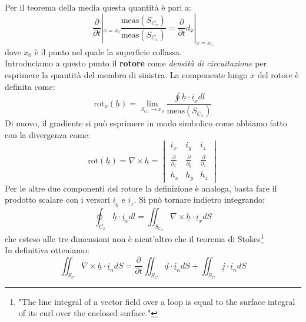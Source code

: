 \documentclass{book}
\begin{document}
        Per il teorema della media questa quantità è pari a:
        \begin{equation}
            \frac{\partial}{\partial t}|_{x=x_{0}} \frac{\textrm{meas}(S_{C_{x}})}{\textrm{meas}(S_{C_{x}})} = \frac{\partial}{\partial t} d_{x}|_{x=x_{0}}
        \end{equation}
        dove $x_{0}$ è il punto nel quale la superficie collassa. \\
        Introduciamo a questo punto il \textbf{rotore} come \textit{densità di circuitazione} per esprimere la quantità del membro di sinistra. La componente lungo $x$ del rotore è definita come:
        \begin{equation}
            \textrm{rot}_{x}(\underline{h}) = \lim_{S_{C_{x}} \to x_{0}} \frac{\displaystyle \oint \underline{h} \cdot \underline{i}_{x} dl}{\textrm{meas}(S_{C_{x}})}
        \end{equation}
        Di nuovo, il gradiente si può esprimere in modo simbolico come abbiamo fatto con la divergenza come:
        \begin{equation}
            \textrm{rot}(\underline{h}) = \nabla \times \underline{h} = \begin{vmatrix} i_{x} & i_{y} & i_{z} \\ \frac{\partial}{\partial_{x}} & \frac{\partial}{\partial_{y}} & \frac{\partial}{\partial_{z}}  \\ h_{x} & h_{y} & h_{z} \end{vmatrix}
        \end{equation}
        Per le altre due componenti del rotore la definizione è analoga, basta fare il prodotto scalare con i versori $\underline{i}_{y}$ e $\underline{i}_{z}$. Si può tornare indietro integrando:
        \begin{equation}
            \oint_{C_{x}} \underline{h} \cdot \underline{i}_{x} dl = \iint_{S_{C_{x}}} \nabla \times \underline{h} \cdot \underline{i}_{x} dS
        \end{equation}
        che esteso alle tre dimensioni non è nient'altro che il teorema di Stokes\footnote{"The line integral of a vector field over a loop is equal to the surface integral of its curl over the enclosed surface."}
        \\
        In definitiva otteniamo:
        \begin{equation}
            \iint_{S_{C}} \nabla \times \underline{h} \cdot \underline{i}_{n} dS = \frac{\partial}{\partial t} \iint_{S_{C}} \underline{d} \cdot \underline{i}_{n} dS + \iint_{S_{C}} \underline{j} \cdot \underline{i}_{n} dS
        \end{equation}
\end{document}
